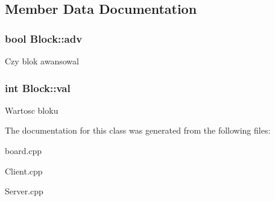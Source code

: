 \subsection{Member Data Documentation}
\hypertarget{classBlock_aa5b4442c70728ea6f44b23f781bd7fec}{
\subsubsection[{adv}]{\setlength{\rightskip}{0pt plus 5cm}bool Block\-::adv}}\label{classBlock_aa5b4442c70728ea6f44b23f781bd7fec}
Czy blok awansowal \hypertarget{classBlock_aa7f0cc1c0ca66b1d5655487ebabacb6b}{
\subsubsection[{val}]{\setlength{\rightskip}{0pt plus 5cm}int Block\-::val}}\label{classBlock_aa7f0cc1c0ca66b1d5655487ebabacb6b}
Wartosc bloku 

The documentation for this class was generated from the following files\-:\begin{DoxyCompactItemize}
\item 
board.\-cpp\item 
Client.\-cpp\item 
Server.\-cpp\end{DoxyCompactItemize}
